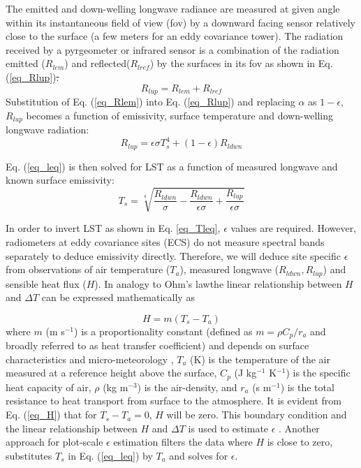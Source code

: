 \documentclass[fleqn,10pt]{wlscirep}
\providecommand{\DIFaddtex}[1]{{\protect\color{blue}\uwave{#1}}} %
\providecommand{\DIFdeltex}[1]{{\protect\color{red}\sout{#1}}}                      %
\providecommand{\DIFaddbegin}{} %
\providecommand{\DIFaddend}{} %
\providecommand{\DIFdelbegin}{} %
\providecommand{\DIFdelend}{} %
\providecommand{\DIFadd}[1]{\texorpdfstring{\DIFaddtex{#1}}{#1}} %
\providecommand{\DIFdel}[1]{\texorpdfstring{\DIFdeltex{#1}}{}} %
\begin{document}
The emitted and down-welling longwave radiance are measured at given angle within its instantaneous field of view (fov) by a downward facing sensor relatively close to the surface (a few meters for an eddy covariance tower). The radiation received by a pyrgeometer or infrared sensor is a combination of the radiation emitted ($R_{lem}$) and reflected($R_{lref}$) by the surfaces in its fov as shown in Eq. (\ref{eq_Rlup})\DIFdelbegin \DIFdel{. 
}\DIFdelend \DIFaddbegin \DIFadd{:
}\DIFaddend \begin{equation}\label{eq_Rlup}
R_{lup} = R_{lem} + R_{lref}
\end{equation}
Substitution of Eq. (\ref{eq_Rlem}) into Eq. (\ref{eq_Rlup}) and replacing  $\alpha$ as $1 - \epsilon$, $R_{lup}$ becomes a function of emissivity, surface temperature and down-welling longwave radiation:
\begin{equation}\label{eq_leq}
R_{lup}= \epsilon \sigma T_{s}^{4} + (1- \epsilon)R_{ldwn}
\end{equation}

Eq. (\ref{eq_leq}) is then solved for LST as a function of measured longwave and known surface emissivity:
\begin{equation}\label{eq_Tleq}
T_{s} = \sqrt[4]{\frac{R_{ldwn}}{\sigma} - \frac{R_{ldwn}}{\epsilon \sigma} + \frac{R_{lup}}{\epsilon \sigma}}
\end{equation}

In order to invert LST as shown in Eq. \eqref{eq_Tleq}, $\epsilon$ values are required. However, radiometers at eddy covariance sites (ECS) do not measure spectral bands separately to deduce emissivity directly. Therefore, we will deduce site specific $\epsilon$ from observations of air temperature ($T_a$), measured longwave ($R_{ldwn},R_{lup}$) and sensible heat flux ($H$)\cite{holmes2016cloud}. In analogy to Ohm's law\DIFaddbegin \DIFadd{, }\DIFaddend the linear relationship between $H$ and $\Delta T$ can be expressed mathematically as\DIFaddbegin \DIFadd{:
}\DIFaddend 

\begin{equation}\label{eq_H}
H= m(T_{s} - T_{a})
\end{equation}
where  $m$ (m s$^{-1}$) is a proportionality constant (defined as $m=\rho C_{p}/r_{a}$ and broadly referred to as heat transfer coefficient) and depends on surface characteristics and micro-meteorology \cite{lhomme1988radiative}, $T_{a}$ (K) is the temperature of the air measured at a reference height above the surface, $C_{p}$ (J kg$^{-1}$ K$^{-1}$) is the specific heat capacity of air, $\rho$ (kg m$^{-3}$) is the air-density, and $r_{a}$ (s m$^{-1}$) is the total resistance to heat transport from surface to the atmosphere. It is evident from Eq. (\ref{eq_H}) that for $T_{s} - T_{a} = 0$, $H$ will be zero. This boundary condition and the linear relationship  between $H$ and $\Delta T $ is used to estimate $\epsilon$ \cite{holmes2009land,holmes2016cloud}. Another approach for plot-scale $\epsilon$ estimation filters the data where $H$ is close to zero, substitutes $T_{s}$ in Eq. (\ref{eq_leq}) by $T_{a}$ and solves for $\epsilon$\cite{maes2019potential}. 
\end{document}
